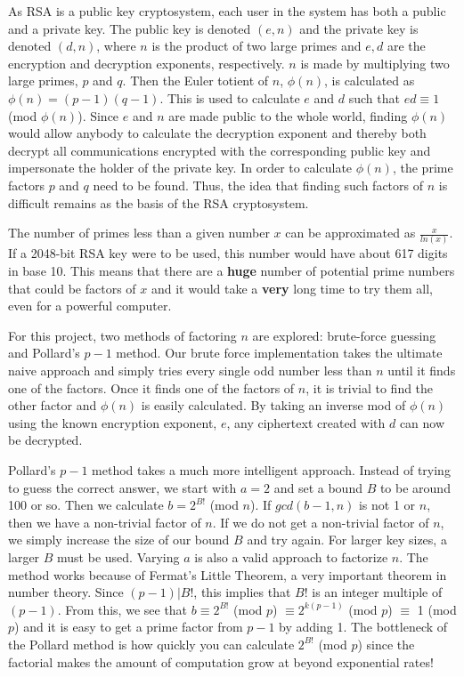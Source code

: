 \documentclass[12pt]{report}
\begin{document}
As RSA is a public key cryptosystem, each user in the system has both a public and a private key. The public key is denoted $(e,n)$ and the private key is denoted $(d,n)$, where $n$ is the product of two large primes and $e,d$ are the encryption and decryption exponents, respectively. $n$ is made by multiplying two large primes, $p$ and $q$. Then the Euler totient of $n$, $\phi(n)$, is calculated as $\phi(n) = (p-1)(q-1)$. This is used to calculate $e$ and $d$ such that $ed \equiv 1$ (mod $\phi(n)$). Since $e$ and $n$ are made public to the whole world, finding $\phi(n)$ would allow anybody to calculate the decryption exponent and thereby both decrypt all communications encrypted with the corresponding public key and impersonate the holder of the private key. In order to calculate $\phi(n)$, the prime factors $p$ and $q$ need to be found. Thus, the idea that finding such factors of $n$ is difficult remains as the basis of the RSA cryptosystem.

The number of primes less than a given number $x$ can be approximated as $\frac{x}{ln(x)}$. If a 2048-bit RSA key were to be used, this number would have about 617 digits in base 10. This means that there are a \textbf{huge} number of potential prime numbers that could be factors of $x$ and it would take a \textbf{very} long time to try them all, even for a powerful computer.

For this project, two methods of factoring $n$ are explored: brute-force guessing and Pollard's $p-1$ method.\cite{pollard} Our brute force implementation takes the ultimate naive approach and simply tries every single odd number less than $n$ until it finds one of the factors. Once it finds one of the factors of $n$, it is trivial to find the other factor and $\phi(n)$ is easily calculated. By taking an inverse mod of $\phi(n)$ using the known encryption exponent, $e$, any ciphertext created with $d$ can now be decrypted.

Pollard's $p-1$ method takes a much more intelligent approach. Instead of trying to guess the correct answer, we start with $a=2$ and set a bound $B$ to be around 100 or so. Then we calculate $b=2^{B!}$ (mod $n$). If $gcd(b-1,n)$ is not 1 or $n$, then we have a non-trivial factor of $n$. If we do not get a non-trivial factor of $n$, we simply increase the size of our bound $B$ and try again. For larger key sizes, a larger $B$ must be used. Varying $a$ is also a valid approach to factorize $n$. The method works because of Fermat's Little Theorem, a very important theorem in number theory. Since $(p-1)|B!$, this implies that $B!$ is an integer multiple of $(p-1)$. From this, we see that
$b \equiv 2^{B!}$ (mod $p$) $\equiv 2^{k(p-1)}$ (mod $p$) $\equiv$ 1 (mod $p$)
and it is easy to get a prime factor from $p-1$ by adding 1. The bottleneck of the Pollard method is how quickly you can calculate $2^{B!}$ (mod $p$) since the factorial makes the amount of computation grow at beyond exponential rates!
\end{document}
